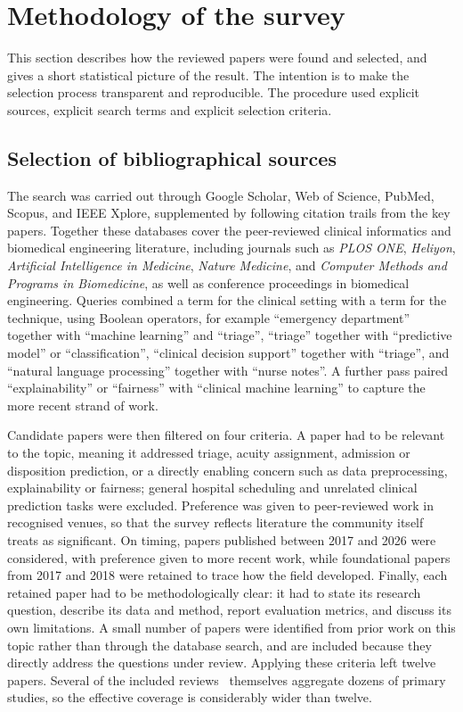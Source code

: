 \documentclass[11pt]{article}
\begin{document}
\section{Methodology of the survey}
\label{sec:methodology}

This section describes how the reviewed papers were found and selected, and gives a short statistical picture of the result. The intention is to make the selection process transparent and reproducible. The procedure used explicit sources, explicit search terms and explicit selection criteria.

\subsection{Selection of bibliographical sources}

The search was carried out through Google Scholar, Web of Science, PubMed, Scopus, and IEEE Xplore, supplemented by following citation trails from the key papers. Together these databases cover the peer-reviewed clinical informatics and biomedical engineering literature, including journals such as \emph{PLOS ONE}, \emph{Heliyon}, \emph{Artificial Intelligence in Medicine}, \emph{Nature Medicine}, and \emph{Computer Methods and Programs in Biomedicine}, as well as conference proceedings in biomedical engineering. Queries combined a term for the clinical setting with a term for the technique, using Boolean operators, for example ``emergency department'' together with ``machine learning'' and ``triage'', ``triage'' together with ``predictive model'' or ``classification'', ``clinical decision support'' together with ``triage'', and ``natural language processing'' together with ``nurse notes''. A further pass paired ``explainability'' or ``fairness'' with ``clinical machine learning'' to capture the more recent strand of work.

Candidate papers were then filtered on four criteria. A paper had to be relevant to the topic, meaning it addressed triage, acuity assignment, admission or disposition prediction, or a directly enabling concern such as data preprocessing, explainability or fairness; general hospital scheduling and unrelated clinical prediction tasks were excluded. Preference was given to peer-reviewed work in recognised venues, so that the survey reflects literature the community itself treats as significant. On timing, papers published between 2017 and 2026 were considered, with preference given to more recent work, while foundational papers from 2017 and 2018 were retained to trace how the field developed. Finally, each retained paper had to be methodologically clear: it had to state its research question, describe its data and method, report evaluation metrics, and discuss its own limitations. A small number of papers were identified from prior work on this topic rather than through the database search, and are included because they directly address the questions under review. Applying these criteria left twelve papers. Several of the included reviews~\cite{Salman2021, Sanchez2022, Fernandes, Antoniadi} themselves aggregate dozens of primary studies, so the effective coverage is considerably wider than twelve.
\end{document}
